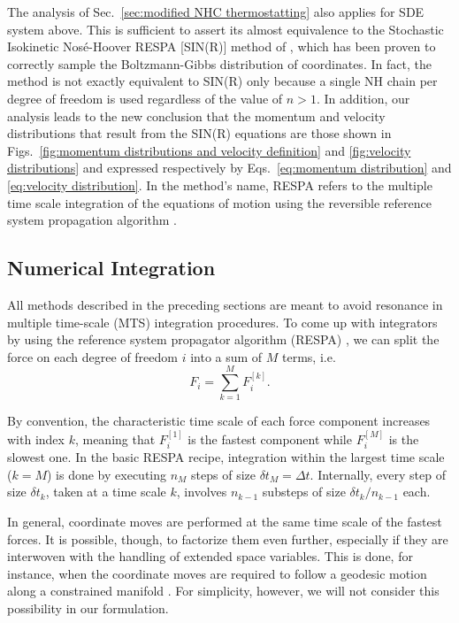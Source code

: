 \documentclass[
aip,
jcp,
reprint,
]{revtex4-1}
\newcommand{\nn}{n}
\begin{document}
The analysis of Sec.~\ref{sec:modified NHC thermostatting} also applies for SDE system above.
This is sufficient to assert its almost equivalence to the Stochastic Isokinetic Nos\'{e}-Hoover RESPA [SIN(R)] method of \citeauthor{Leimkuhler_2013} \cite{Leimkuhler_2013}, which has been proven to correctly sample the Boltzmann-Gibbs distribution of coordinates.
In fact, the method is not exactly equivalent to SIN(R) only because a single NH chain per degree of freedom is used regardless of the value of $\nn > 1$.
In addition, our analysis leads to the new conclusion that the momentum and velocity distributions that result from the SIN(R) equations are those shown in Figs.~\ref{fig:momentum distributions and velocity definition} and \ref{fig:velocity distributions} and expressed respectively by Eqs.~\eqref{eq:momentum distribution} and \eqref{eq:velocity distribution}.
In the method's name, RESPA refers to the multiple time scale integration of the equations of motion using the reversible reference system propagation algorithm \cite{Tuckerman_1992}.

\subsection{Numerical Integration}
\label{sec: numerical integration}

All methods described in the preceding sections are meant to avoid resonance in multiple time-scale (MTS) integration procedures.
To come up with integrators by using the reference system propagator algorithm (RESPA) \cite{Tuckerman_1992}, we can split the force on each degree of freedom $i$ into a sum of $M$ terms, i.e.
\begin{equation*}
F_i = \sum_{k=1}^M F_i^{[k]}.
\end{equation*}

By convention, the characteristic time scale of each force component increases with index $k$, meaning that $F_i^{[1]}$ is the fastest component while $F_i^{[M]}$ is the slowest one.
In the basic RESPA recipe, integration within the largest time scale ($k=M$) is done by executing $n_M$ steps of size $\delta t_M = \Delta t$.
Internally, every step of size $\delta t_k$, taken at a time scale $k$, involves $n_{k-1}$ substeps of size $\delta t_k/n_{k-1}$ each.

In general, coordinate moves are performed at the same time scale of the fastest forces.
It is possible, though, to factorize them even further, especially if they are interwoven with the handling of extended space variables.
This is done, for instance, when the coordinate moves are required to follow a geodesic motion along a constrained manifold \cite{Leimkuhler_2016}.
For simplicity, however, we will not consider this possibility in our formulation.
\end{document}

